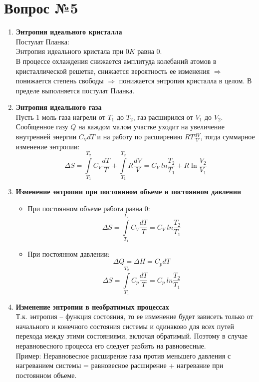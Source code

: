 \documentclass[14pt,a4paper]{scrartcl}
\begin{document}
\section*{Вопрос №5}
\begin{enumerate}[label=\arabic*)]
	\item \textbf{Энтропия идеального кристалла} \\
	Постулат Планка: \\
	Энтропия идеального кристала при $0K$ равна $0$. \\
	В процессе охлаждения снижается амплитуда колебаний атомов в кристаллической решетке, снижается вероятность ее изменения $\Rightarrow$ понижается степень свободы $\Rightarrow$ понижается энтропия кристалла в целом. В пределе выполняется постулат Планка. 
	\item \textbf{Энтропия идеального газа} \\
	Пусть 1 моль газа нагрели от $T_1$ до $T_2$, газ расширился от $V_1$ до $V_2$. Сообщенное газу $Q$ на каждом малом участке уходит на увеличение внутренней энергии $C_V dT$ и на работу по расширению $ RT \frac{dV}{V} $, тогда суммарное изменение энтропии:
	\[
	\Delta{S} = \int\limits_{T_1}^{T_2} C_V \dfrac{dT}{T} + \int\limits_{T_1}^{T_2} R \dfrac{dV}{V} = 
	C_V \ ln{\frac{T_2}{T_1}} + R \ln{\frac{V_2}{V_1}} 
	\]
	
	\item \textbf{Изменение энтропии при постоянном объеме и постоянном давлении} \\
	\begin{itemize}
		\item При постоянном объеме работа равна 0:
		$$ 	\Delta{S} = \int\limits_{T_1}^{T_2} C_V \dfrac{dT}{T} = C_V \ ln{\frac{T_2}{T_1}} $$ 
		\item При постоянном давлении:
		$$ \Delta{Q} = \Delta{H} = C_p dT $$
		$$ \Delta{S} = \int\limits_{T_1}^{T_2} C_p \dfrac{dT}{T} = C_p \ ln{\frac{T_2}{T_1}}  $$
	\end{itemize}
	\item \textbf{Изменение энтропии в необратимых процессах} \\
	Т.к. энтропия -- функция состояния, то ее изменение будет зависеть только от начального и конечного состояния системы и одинаково для всех путей перехода между этими состояниями, включая обратимый. Поэтому в случае неравновесного процесса его следует разбить на равновесные. \\ 
	Пример: Неравновесное расширение газа против меньшего давления с нагреванием системы = равновесное расширение + нагревание при постоянном объеме.
\end{enumerate}
\end{document}
